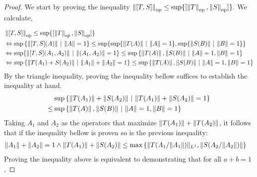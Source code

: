 \documentclass[10pt,a4paper]{amsart}
\theoremstyle{definition}
\theoremstyle{definition}
\theoremstyle{definition}
\theoremstyle{definition}
\theoremstyle{definition}
\theoremstyle{definition}
\begin{document}
\begin{proof}

We start by proving the inequality $\left\lVert [T, S] \right\rVert_{\text{op}} \leq \sup \{[\left\lVert T \right\rVert_{\text{op}}, \left\lVert S \right\rVert_{\text{op}}]\}$. We calculate,

\begin{align*} 
  & \left\lVert [T, S] \right\rVert_{\text{op}} \leq \sup \{[\left\lVert T \right\rVert_{\text{op}}, \left\lVert S \right\rVert_{\text{op}}]\} \\
  &\Leftrightarrow \sup{\{ \left\lVert [T, S] (A) \right\rVert  \hspace{2pt} |  \hspace{2pt}  \left\lVert A \right\rVert = 1  \}}  
  \leq \sup \{ \sup\{ \left\lVert T (A) \right\rVert \hspace{2pt} |  \hspace{2pt}  \left\lVert A \right\rVert = 1 \}, \sup\{ \left\lVert S (B) \right\rVert \hspace{2pt} |  \hspace{2pt}  \left\lVert B \right\rVert = 1 \}\} \\
  &\Leftrightarrow  \text{sup}{\{ \left\lVert [T, S] (A_1, A_2) \right\rVert   \hspace{2pt} |  \hspace{2pt}  \left\lVert (A_1, A_2 ) \right\rVert = 1  \}}  
  \leq   \sup \left\{  \left\lVert T (A) \right\rVert ,   \left\lVert S (B) \right\rVert  \, \vert \,   \left\lVert A \right\rVert = 1, \left\lVert B \right\rVert = 1 \right\}  \\
  & \Leftrightarrow \sup \left\{  \left\lVert T (A_1) + S (A_2) \right\rVert  \, \vert \, \left\lVert A_1 \right\rVert + \left\lVert A_2 \right\rVert= 1 \right\}  
  \leq \sup \left\{  \left\lVert T (A) \right\rVert,   \left\lVert S (B) \right\rVert  \, \vert \,   \left\lVert A \right\rVert = 1, \left\lVert B \right\rVert = 1 \right\}  \\
\end{align*}
By the triangle inequality, proving the inequality bellow suffices to establish the inequality at hand.
\begin{align*}
  &\sup \left\{  \left\lVert T (A_1) \right\rVert +   \left\lVert S (A_2) \right\rVert  \, \vert \, \left\lVert T(A_1) \right\rVert + \left\lVert S(A_2) \right\rVert= 1 \right\}  \\
  \leq & \sup \left\{  \left\lVert T (A) \right\rVert,   \left\lVert S (B) \right\rVert  \, \vert \,   \left\lVert A \right\rVert = 1, \left\lVert B \right\rVert = 1 \right\} 
\end{align*}
Taking $A_1$ and $A_2$ as the operators that maximize $\left\lVert T (A_1) \right\rVert + \left\lVert T (A_2) \right\rVert$, it follows that if the inequality bellow is proven so is the  previous inequality:
\begin{align*}
  &  \lVert A_{1} \rVert+ \lVert A_{2} \rVert=1  \wedge  \left\lVert T (A_1) \right\rVert +   \left\lVert S (A_2) \right\rVert   
  \leq   \max \left\{  \left\lVert T (A_{1} / \lVert A_{1} \rVert ) \rVert_{L^1},   \lVert S (A_{2} / \lVert A_{2} \rVert )  \right\rVert  \right\}  
\end{align*}
Proving the inequality above is equivalent to demonstrating that for all $a+b=1$,

\end{proof}
\end{document}
